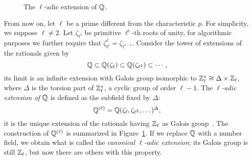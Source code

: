 \documentclass{sig-alternate}
\begin{document}
\begin{figure}
  \centering
  \caption{The $\ell$-adic extension of $\mathbb{Q}$.}
  \label{fig:ladic}
\end{figure}

From now on, let $\ell$ be a prime different from the characteristic
$p$. For simplicity, we suppose $\ell\ne2$. Let $\zeta_{\ell^i}$ be
primitive $\ell^i$-th roots of unity, for algorithmic purposes we
further require that
$\zeta_{\ell^i}^\ell=\zeta_{\ell^{i-1}}$. Consider the tower of
extensions of the rationals given by
\begin{equation*}
  \mathbb{Q} \subset \mathbb{Q}(\zeta_\ell) \subset \mathbb{Q}(\zeta_{\ell^2}) \subset \cdots,
\end{equation*}
its limit is an infinite extension with Galois group isomorphic to
$\mathbb{Z}_\ell^\ast\cong\Delta\times\mathbb{Z}_\ell$, where $\Delta$ is the torsion
part of $\mathbb{Z}_\ell^\ast$, a cyclic group of order $\ell-1$. The
\emph{$\ell$-adic extension of $\mathbb{Q}$} is defined as the subfield fixed
by $\Delta$:
\begin{equation}
  \label{eq:}
  \mathbb{Q}^{(\ell)} = \mathbb{Q}(\zeta_\ell, \zeta_{\ell^2}, \dots)^\Delta,
\end{equation}
it is the unique extension of the rationals having $\mathbb{Z}_\ell$ as Galois
group~\cite{lang1990cyclotomic,washington1997introduction}. The
construction of $\mathbb{Q}^{(\ell)}$ is summarized in
Figure~\ref{fig:ladic}. If we replace $\mathbb{Q}$ with a number field, we
obtain what is called the \emph{canonical $\ell$-adic extension}; its
Galois group is still $\mathbb{Z}_\ell$, but now there are others with this
property.
\end{document}
